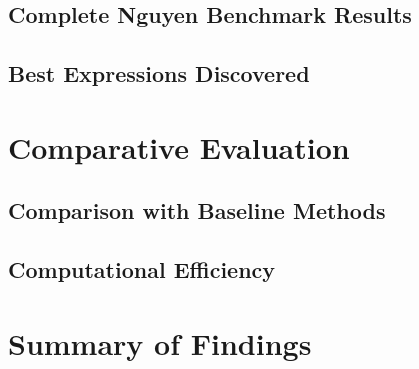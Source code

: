\subsection{Complete Nguyen Benchmark Results}

\subsection{Best Expressions Discovered}

\section{Comparative Evaluation}

\subsection{Comparison with Baseline Methods}

\subsection{Computational Efficiency}

\section{Summary of Findings}


